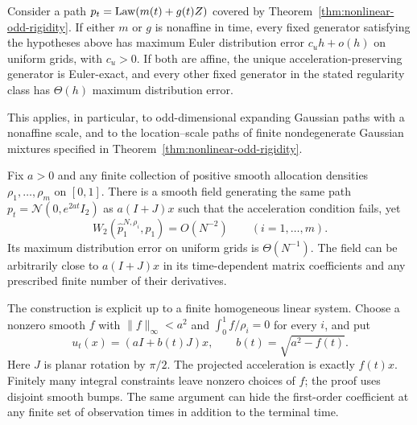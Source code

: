 \begin{corollary}
\label{cor:odd-global-order}
Consider a path $p_t=\operatorname{Law}(m(t)+g(t)Z)$ covered by
Theorem~\ref{thm:nonlinear-odd-rigidity}.  If either $m$ or $g$ is
nonaffine in time, every fixed generator satisfying the hypotheses
above has maximum Euler distribution error $c_uh+o(h)$ on uniform
grids, with $c_u>0$.  If both are affine, the unique
acceleration-preserving generator is Euler-exact, and every other
fixed generator in the stated regularity class has $\Theta(h)$
maximum distribution error.
\end{corollary}
This applies, in particular, to odd-dimensional expanding Gaussian
paths with a nonaffine scale, and to the location--scale paths of
finite nondegenerate Gaussian mixtures specified in
Theorem~\ref{thm:nonlinear-odd-rigidity}.

\begin{proposition}
\label{prop:finite-schedule-blindness}
Fix $a>0$ and any finite collection of positive smooth allocation
densities $\rho_1,\ldots,\rho_m$ on $[0,1]$.  There is a smooth field
generating the same path
$p_t=\mathcal N(0,e^{2at}I_2)$ as $a(I+J)x$ such that the acceleration
condition fails, yet
\[
 W_2(\widehat p_1^{N,\rho_i},p_1)=O(N^{-2})
 \qquad (i=1,\ldots,m).
\]
Its maximum distribution error on uniform grids is $\Theta(N^{-1})$.
The field can be arbitrarily close to $a(I+J)x$ in its time-dependent
matrix coefficients and any prescribed finite number of their
derivatives.
\end{proposition}

The construction is explicit up to a finite homogeneous linear system.
Choose a nonzero smooth $f$ with $\|f\|_\infty<a^2$ and
$\int_0^1 f/\rho_i=0$ for every $i$, and put
\begin{equation}
 u_t(x)=(aI+b(t)J)x,\qquad b(t)=\sqrt{a^2-f(t)}.
 \label{eq:blind-gaussian-generator}
\end{equation}
Here $J$ is planar rotation by $\pi/2$.  The projected acceleration is
exactly $f(t)x$.  Finitely many integral constraints leave nonzero
choices of $f$; the proof uses disjoint smooth bumps.  The same argument
can hide the first-order coefficient at any finite set of observation
times in addition to the terminal time.

